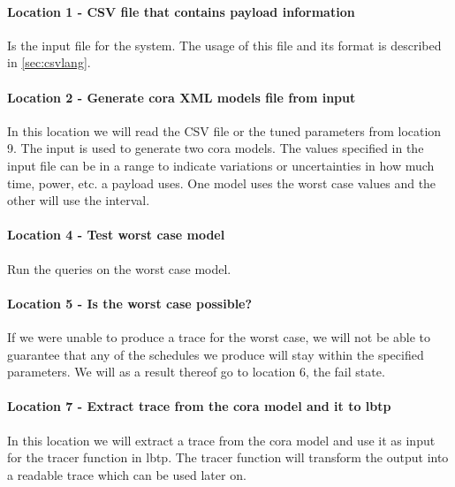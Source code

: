 \paragraph{Location 1 - CSV file that contains payload information} 
Is the input file for the system. 
The usage of this file and its format is described in \cref{sec:csvlang}.

\paragraph{Location 2 - Generate \gls{cora} XML models file from input} 
In this location we will read the CSV file or the tuned parameters from location 9. 
The input is used to generate two \gls{cora} models.
The values specified in the input file can be in a range to indicate variations or uncertainties in how much time, power, etc. a payload uses.
One model uses the worst case values and the other will use the interval. 


\paragraph{Location 4 - Test worst case model} 
Run the queries on the worst case model.

\paragraph{Location 5 - Is the worst case possible?} 
If we were unable to produce a trace for the worst case, we will not be able to guarantee that any of the schedules we produce will stay within the specified parameters. 
We will as a result thereof go to location 6, the fail state.

\paragraph{Location 7 - Extract trace from the \gls{cora} model and it to \acrshort{lbtp}} 
In this location we will extract a trace from the \gls{cora} model and use it as input for the tracer function in \acrshort{lbtp}. 
The tracer function will transform the output into a readable trace which can be used later on.

